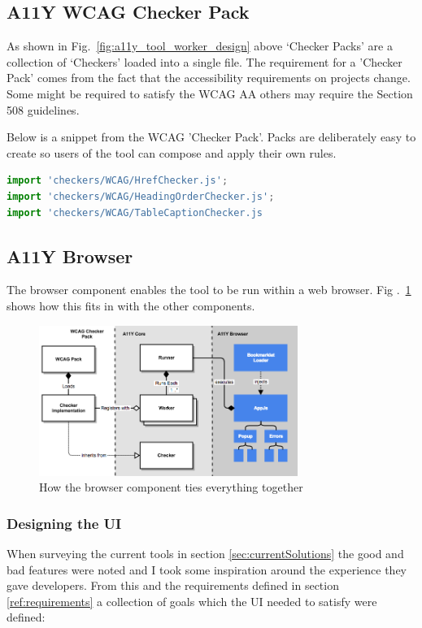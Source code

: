 \subsection{A11Y WCAG Checker Pack}
As shown in Fig.~\ref{fig:a11y_tool_worker_design} above `Checker Packs' are
a collection of `Checkers' loaded into a single file. The requirement for a
'Checker Pack' comes from the fact that the accessibility requirements on
projects change. Some might be required to satisfy the WCAG AA others may
require the Section 508 guidelines.

Below is a snippet from the WCAG 'Checker Pack'. Packs are deliberately easy to
create so users of the tool can compose and apply their own rules.

\begin{lstlisting}[language=JavaScript]
import 'checkers/WCAG/HrefChecker.js';
import 'checkers/WCAG/HeadingOrderChecker.js';
import 'checkers/WCAG/TableCaptionChecker.js
\end{lstlisting}

\subsection{A11Y Browser}
The browser component enables the tool to be run within a web browser. Fig
.~\ref{fig:a11y_tool_browser_design} shows how this fits in with the other
components.

\begin{figure}[H]
\centering
\includegraphics[width=0.75\textwidth]{figures/a11y_tool_browser_design}
\captionsetup{justification=centering}
\caption{How the browser component ties everything together
\label{fig:a11y_tool_browser_design}}
\end{figure}

\subsubsection{Designing the UI}
When surveying the current tools in section \ref{sec:currentSolutions}
the good and bad features were noted and I took some inspiration around
the experience they gave developers. From this and the requirements defined
in section \ref{ref:requirements} a collection of goals which the UI needed
to satisfy were defined:

